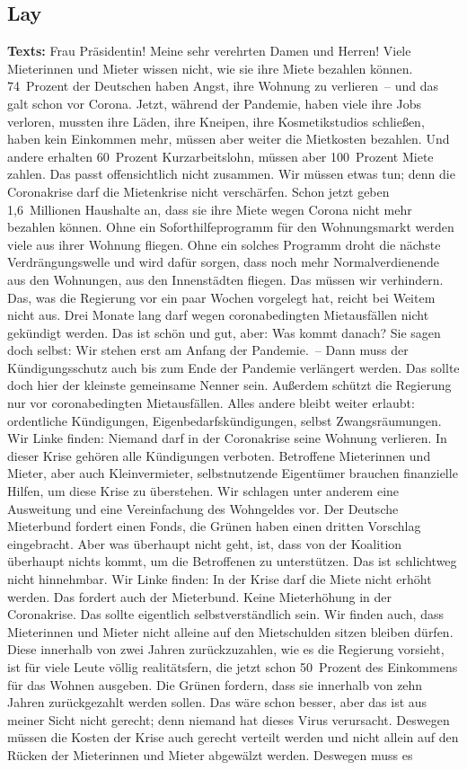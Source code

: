 \documentclass{article}
\begin{document}
\subsection{Lay}
\noindent\textbf{Texts:} Frau Präsidentin! Meine sehr verehrten Damen und Herren! Viele Mieterinnen und Mieter wissen nicht, wie sie ihre Miete bezahlen können. 74 Prozent der Deutschen haben Angst, ihre Wohnung zu verlieren – und das galt schon vor Corona. Jetzt, während der Pandemie, haben viele ihre Jobs verloren, mussten ihre Läden, ihre Kneipen, ihre Kosmetikstudios schließen, haben kein Einkommen mehr, müssen aber weiter die Mietkosten bezahlen. Und andere erhalten 60 Prozent Kurzarbeitslohn, müssen aber 100 Prozent Miete zahlen. Das passt offensichtlich nicht zusammen. Wir müssen etwas tun; denn die Coronakrise darf die Mietenkrise nicht verschärfen.  Schon jetzt geben 1,6 Millionen Haushalte an, dass sie ihre Miete wegen Corona nicht mehr bezahlen können. Ohne ein Soforthilfeprogramm für den Wohnungsmarkt werden viele aus ihrer Wohnung fliegen. Ohne ein solches Programm droht die nächste Verdrängungswelle und wird dafür sorgen, dass noch mehr Normalverdienende aus den Wohnungen, aus den Innenstädten fliegen. Das müssen wir verhindern.  Das, was die Regierung vor ein paar Wochen vorgelegt hat, reicht bei Weitem nicht aus. Drei Monate lang darf wegen coronabedingten Mietausfällen nicht gekündigt werden. Das ist schön und gut, aber: Was kommt danach? Sie sagen doch selbst: Wir stehen erst am Anfang der Pandemie. – Dann muss der Kündigungsschutz auch bis zum Ende der Pandemie verlängert werden. Das sollte doch hier der kleinste gemeinsame Nenner sein.  Außerdem schützt die Regierung nur vor coronabedingten Mietausfällen. Alles andere bleibt weiter erlaubt: ordentliche Kündigungen, Eigenbedarfskündigungen, selbst Zwangsräumungen. Wir Linke finden: Niemand darf in der Coronakrise seine Wohnung verlieren. In dieser Krise gehören alle Kündigungen verboten.  Betroffene Mieterinnen und Mieter, aber auch Kleinvermieter, selbstnutzende Eigentümer brauchen finanzielle Hilfen, um diese Krise zu überstehen. Wir schlagen unter anderem eine Ausweitung und eine Vereinfachung des Wohngeldes vor. Der Deutsche Mieterbund fordert einen Fonds, die Grünen haben einen dritten Vorschlag eingebracht. Aber was überhaupt nicht geht, ist, dass von der Koalition überhaupt nichts kommt, um die Betroffenen zu unterstützen. Das ist schlichtweg nicht hinnehmbar.  Wir Linke finden: In der Krise darf die Miete nicht erhöht werden. Das fordert auch der Mieterbund. Keine Mieterhöhung in der Coronakrise. Das sollte eigentlich selbstverständlich sein.  Wir finden auch, dass Mieterinnen und Mieter nicht alleine auf den Mietschulden sitzen bleiben dürfen. Diese innerhalb von zwei Jahren zurückzuzahlen, wie es die Regierung vorsieht, ist für viele Leute völlig realitätsfern, die jetzt schon 50 Prozent des Einkommens für das Wohnen ausgeben. Die Grünen fordern, dass sie innerhalb von zehn Jahren zurückgezahlt werden sollen. Das wäre schon besser, aber das ist aus meiner Sicht nicht gerecht; denn niemand hat dieses Virus verursacht. Deswegen müssen die Kosten der Krise auch gerecht verteilt werden und nicht allein auf den Rücken der Mieterinnen und Mieter abgewälzt werden.  Deswegen muss es 
\end{document}
